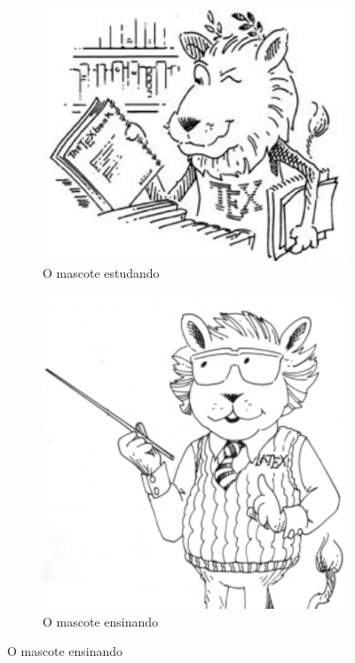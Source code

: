 \begin{figure}[!htpb]
    \centering
	\caption{O mascote do \LaTeX em diferentes poses}\label{f_c2_mascotes}
	\begin{subfigure}[t]{.45\textwidth}
	\caption{O mascote estudando}\label{f_c2_masco1}
        \includegraphics[width=\textwidth]{figs/lion}
        
    \end{subfigure}
    \begin{subfigure}[t]{.4\textwidth}
	\caption{O mascote ensinando}\label{f_c2_masco2}
        \includegraphics[width=\textwidth]{figs/latex_lion}
        
    \end{subfigure}
\end{figure}

